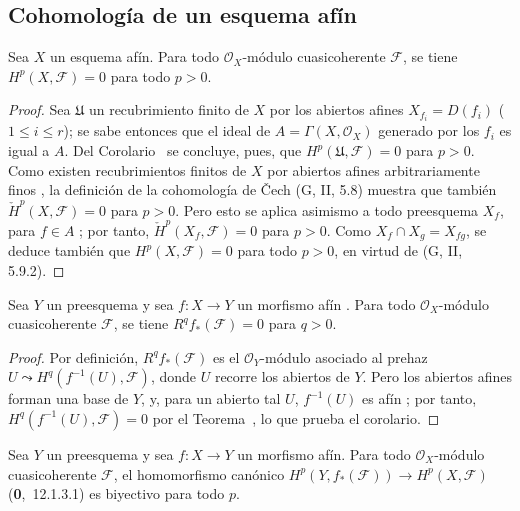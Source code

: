 \subsection{Cohomología de un esquema afín}
\label{subsection:III.1.3}
\label{subsection:III.1.3-fr}

\begin{theorem}[1.3.1]
\label{III.1.3.1}
\label{III.1.3.1-fr}
Sea $X$ un esquema afín.
Para todo $\mathcal O_X$-módulo cuasicoherente $\mathcal F$, se tiene $H^p(X,\mathcal F)=0$ para todo $p>0$.
\end{theorem}

\begin{proof}
Sea $\mathfrak U$ un recubrimiento finito de $X$ por los abiertos afines $X_{f_i}=D(f_i)$ ($1\leq i\leq r$); se sabe entonces que el ideal de $A=\Gamma(X,\mathcal O_X)$ generado por los $f_i$ es igual a $A$.
Del Corolario~ se concluye, pues, que $H^p(\mathfrak U,\mathcal F)=0$ para $p>0$.
Como existen recubrimientos finitos de $X$ por abiertos afines arbitrariamente finos , la definición de la cohomología de \v Cech (G, II, 5.8) muestra que también $\check H^p(X,\mathcal F)=0$ para $p>0$.
Pero esto se aplica asimismo a todo preesquema $X_f$, para $f\in A$ ; por tanto, $\check H^p(X_f,\mathcal F)=0$ para $p>0$.
Como $X_f\cap X_g=X_{fg}$, se deduce también que $H^p(X,\mathcal F)=0$ para todo $p>0$, en virtud de (G, II, 5.9.2).
\end{proof}

\begin{corollary}[1.3.2]
\label{III.1.3.2}
\label{III.1.3.2-fr}
Sea $Y$ un preesquema y sea $f:X\to Y$ un morfismo afín .
Para todo $\mathcal O_X$-módulo cuasicoherente $\mathcal F$, se tiene $R^qf_*(\mathcal F)=0$ para $q>0$.
\end{corollary}

\begin{proof}
Por definición, $R^qf_*(\mathcal F)$ es el $\mathcal O_Y$-módulo asociado al prehaz $U\leadsto H^q(f^{-1}(U),\mathcal F)$, donde $U$ recorre los abiertos de $Y$.
Pero los abiertos afines forman una base de $Y$, y, para un abierto tal $U$, $f^{-1}(U)$ es afín ; por tanto, $H^q(f^{-1}(U),\mathcal F)=0$ por el Teorema~, lo que prueba el corolario.
\end{proof}

\begin{corollary}[1.3.3]
\label{III.1.3.3}
\label{III.1.3.3-fr}
Sea $Y$ un preesquema y sea $f:X\to Y$ un morfismo afín.
Para todo $\mathcal O_X$-módulo cuasicoherente $\mathcal F$, el homomorfismo canónico $H^p(Y,f_*(\mathcal F))\to H^p(X,\mathcal F)$ \textup{(\textbf{0},~12.1.3.1)} es biyectivo para todo $p$.
\end{corollary}

